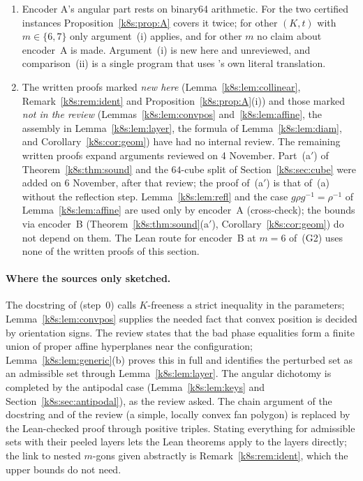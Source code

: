 \begin{enumerate}[label=(G\arabic*)]
\begin{enumerate}[label=(E\arabic*)]
, , , ) with the notions of
Section~\ref{k8s:sec:setting};
\item SHA-256.
\end{enumerate}
So the sixfold bound is formally verified end to end via encoder~B, assuming the $64$ cake\_lpr verdicts and the trust
items (E1)--(E6). The results of this section other than the cited Lean theorems are written proofs only, and the
sevenfold bound and the route of encoder~A are not formally verified end to end.
\item Encoder A's angular part rests on binary64 arithmetic. For the two certified instances
Proposition~\ref{k8s:prop:A} covers it twice; for other $(K,t)$ with $m\in\{6,7\}$ only argument~(i) applies, and for
other $m$ no claim about encoder~A is made. Argument~(i) is new here and unreviewed, and comparison~(ii) is a single
program that uses 's own literal translation.
\item The written proofs marked \emph{new here} (Lemma~\ref{k8s:lem:collinear}, Remark~\ref{k8s:rem:ident} and
Proposition~\ref{k8s:prop:A}(i)) and those marked \emph{not in the review} (Lemmas~\ref{k8s:lem:convpos}
and~\ref{k8s:lem:affine}, the assembly in Lemma~\ref{k8s:lem:layer}, the formula of Lemma~\ref{k8s:lem:diam}, and
Corollary~\ref{k8s:cor:geom}) have had no internal review. The remaining written proofs expand arguments reviewed on
4 November. Part~(a$'$) of Theorem~\ref{k8s:thm:sound} and the $64$-cube split of Section~\ref{k8s:sec:cube} were added
on 6 November, after that review; the proof of~(a$'$) is that of~(a) without the reflection step.
Lemma~\ref{k8s:lem:refl} and the case $g\rho g^{-1}=\rho^{-1}$ of Lemma~\ref{k8s:lem:affine} are used only by
encoder~A (cross-check); the bounds via encoder~B (Theorem~\ref{k8s:thm:sound}(a$'$), Corollary~\ref{k8s:cor:geom})
do not depend on them. The Lean route for encoder~B at $m=6$ of~(G2) uses none of the written proofs of this section.
\end{enumerate}

\paragraph{Where the sources only sketched.} The docstring of  (step~0) calls $K$-freeness a strict
inequality in the parameters; Lemma~\ref{k8s:lem:convpos} supplies the needed fact that convex position is decided by
orientation signs. The review states that the bad phase equalities form a finite union of proper affine hyperplanes
near the configuration; Lemma~\ref{k8s:lem:generic}(b) proves this in full and identifies the perturbed set as an
admissible set through Lemma~\ref{k8s:lem:layer}. The angular dichotomy is completed by the antipodal case
(Lemma~\ref{k8s:lem:keys} and Section~\ref{k8s:sec:antipodal}), as the review asked. The chain argument of the docstring
and of the review (a simple, locally convex fan polygon) is replaced by the Lean-checked proof through positive
triples. Stating everything for admissible sets with their peeled layers lets the Lean theorems apply to the layers
directly; the link to nested $m$-gons given abstractly is Remark~\ref{k8s:rem:ident}, which the upper bounds do not
need.

